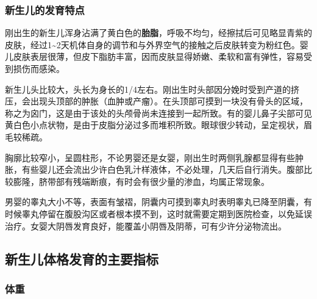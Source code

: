\subsubsection{新生儿的发育特点}

刚出生的新生儿浑身沾满了黄白色的\textbf{胎脂}，呼吸不均匀，经擦拭后可见略显青紫的皮肤，经过1\textasciitilde2天机体自身的调节和与外界空气的接触之后皮肤转变为粉红色。婴儿皮肤表层很薄，但皮下脂肪丰富，因而皮肤显得娇嫩、柔软和富有弹性，容易受到损伤而感染。

新生儿头比较大，头长为身长的1/4左右。刚出生时头部因分娩时受到产道的挤压，会出现头顶部的肿胀（血肿或产瘤）。在头顶部可摸到一块没有骨头的区域，称之为囟门，这是由于该处的头颅骨尚未连接到一起所致。有的婴儿鼻子尖部可见黄白色小点状物，是由于皮脂分泌过多而堆积所致。眼球很少转动，呈定视状，眉毛较稀疏。

胸廓比较窄小，呈圆柱形，不论男婴还是女婴，刚出生时两侧乳腺都显得有些肿胀，有些婴儿还会流出少许白色乳汁样液体，不必处理，几天后自行消失。腹部比较膨隆，脐带部有残端断痕，有时会有很少量的渗血，均属正常现象。

男婴的睾丸大小不等，表面有皱褶，阴囊内可摸到睾丸时表明睾丸已降至阴囊，有时候睾丸停留在腹股沟区或者根本摸不到，这时就需要定期到医院检查，以免延误治疗。女婴大阴唇发育良好，能覆盖小阴唇及阴蒂，可有少许分泌物流出。



\subsection{新生儿体格发育的主要指标}

 
\subsubsection{体重}




